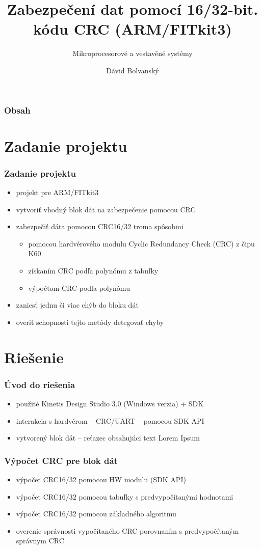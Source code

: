 \documentclass[xcolor=dvipsnames]{beamer}
\title{Zabezpečení dat pomocí 16/32-bit. kódu CRC (ARM/FITkit3)}
\subtitle{Mikroprocesorové a vestavěné systémy}
\author{Dávid Bolvanský}
\institute{Vysoké učení technické v Brně \\Fakulta informačních technologií}
\begin{document}
 
\frame{\titlepage}

\begin{frame}
\frametitle{Obsah}
\tableofcontents
\end{frame}

\section{Zadanie projektu}
 
\begin{frame}
\frametitle{Zadanie projektu}
\begin{itemize}
\item projekt pre ARM/FITkit3
\item vytvoriť vhodný blok dát na zabezpečenie pomocou CRC
\item zabezpečiť dáta pomocou CRC16/32 troma spôsobmi
\begin{itemize}
	\item pomocou hardvérového modulu Cyclic Redundancy Check (CRC) z čipu K60
	\item získaním CRC podľa polynómu z tabuľky
	\item výpočtom CRC podľa polynómu
\end{itemize}
\item zaniesť jednu či viac chýb do bloku dát
\item overiť schopnosti tejto metódy detegovať chyby
\end{itemize}
\end{frame}


\section{Riešenie}

\begin{frame}
\frametitle{Úvod do riešenia}
\begin{itemize}
\item použité Kinetis Design Studio 3.0 (Windows verzia) + SDK
\item interakcia s hardvérom -- CRC/UART -- pomocou SDK API
\item vytvorený blok dát -- reťazec obsahujúci text Lorem Ipsum
\end{itemize}
\end{frame}

\begin{frame}
	\frametitle{Výpočet CRC pre blok dát}
	\begin{itemize}
		\item výpočet CRC16/32 pomocou HW modulu (SDK API)
		\item výpočet CRC16/32 pomocou tabuľky s predvypočítanými hodnotami 
		\item výpočet CRC16/32 pomocou základného algoritmu
		\item overenie správnosti vypočítaného CRC porovnaním s predvypočítaným správnym CRC
	\end{itemize}
\end{frame}
\end{document}
